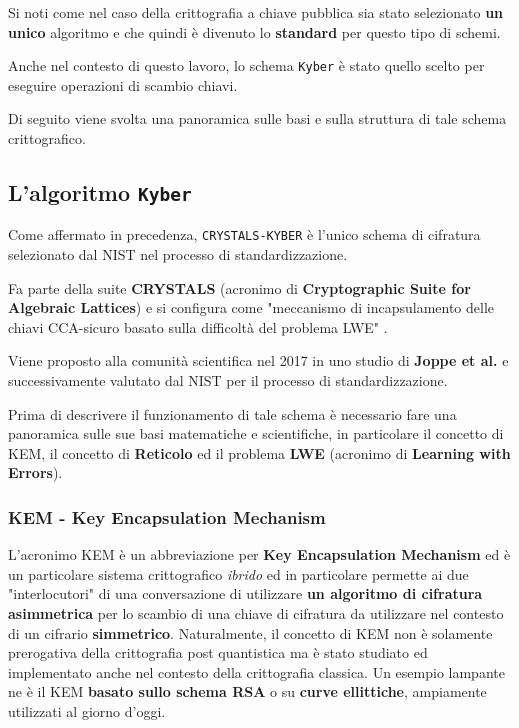 \documentclass[a4paper, 12pt, oneside]{article}
\theoremstyle{definition}
\begin{document}
Si noti come nel caso della crittografia a chiave pubblica sia stato selezionato \textbf{un unico} algoritmo e che quindi è divenuto lo \textbf{standard} per questo tipo di schemi.

Anche nel contesto di questo lavoro, lo schema \texttt{Kyber} è stato quello scelto per eseguire operazioni di scambio chiavi.

Di seguito viene svolta una panoramica sulle basi e sulla struttura di tale schema crittografico.

\newpage
\subsection{L'algoritmo \texttt{Kyber}}
Come affermato in precedenza, \texttt{CRYSTALS-KYBER} è l'unico schema di cifratura selezionato dal NIST nel processo di standardizzazione.

Fa parte della suite \textbf{CRYSTALS} (acronimo di \textbf{Cryptographic Suite for Algebraic Lattices}) \cite{crystals} e si configura come "meccanismo di incapsulamento delle chiavi CCA-sicuro basato sulla difficoltà del problema LWE" \cite{crystals-kyber}.

Viene proposto alla comunità scientifica nel 2017 in uno studio \cite{cryptoeprint:2017/634} di \textbf{Joppe et al.} e successivamente valutato dal NIST per il processo di standardizzazione.

Prima di descrivere il funzionamento di tale schema è necessario fare una panoramica sulle sue basi matematiche e scientifiche, in particolare il concetto di KEM, il concetto di \textbf{Reticolo} ed il problema \textbf{LWE} (acronimo di \textbf{Learning with Errors}).

\subsubsection{KEM - Key Encapsulation Mechanism}
L'acronimo KEM è un abbreviazione per \textbf{Key Encapsulation Mechanism} ed è un particolare sistema crittografico \textit{ibrido} ed in particolare permette ai due "interlocutori" di una conversazione di utilizzare \textbf{un algoritmo di cifratura asimmetrica} per lo scambio di una chiave di cifratura da utilizzare nel contesto di un cifrario \textbf{simmetrico}. Naturalmente, il concetto di KEM non è solamente prerogativa della crittografia post quantistica ma è stato studiato ed implementato anche nel contesto della crittografia classica. Un esempio lampante ne è il KEM \textbf{basato sullo schema RSA} o su \textbf{curve ellittiche}, ampiamente utilizzati al giorno d'oggi.
\end{document}
